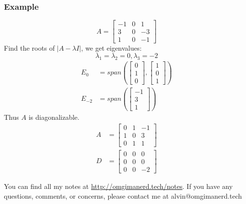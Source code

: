 \documentclass{math}
\begin{document}
\subsubsection*{Example}
\[ A = \begin{bmatrix}-1 & 0 & 1 \\ 3 & 0 & -3 \\ 1 & 0 & -1\end{bmatrix} \]
Find the roots of \( |A-\lambda I| \), we get eigenvalues:
\[ \lambda_1 = \lambda_2 = 0, \lambda_3 = -2 \]
\begin{align*}
  E_0 &= span\left(
    \begin{bmatrix}0 \\ 1 \\ 0\end{bmatrix},
    \begin{bmatrix}1 \\ 0 \\ 1\end{bmatrix}\right) \\
  E_{-2} &= span\left(\begin{bmatrix}-1 \\ 3 \\ 1\end{bmatrix}\right)
\end{align*}
Thus \( A \) is diagonalizable.
\begin{align*}
  A &= \begin{bmatrix}
    0 & 1 & -1 \\
    1 & 0 & 3 \\
    0 & 1 & 1
  \end{bmatrix} \\
  D &= \begin{bmatrix}
    0 & 0 & 0 \\
    0 & 0 & 0 \\
    0 & 0 & -2
  \end{bmatrix}
\end{align*}

\begin{center}
  You can find all my notes at \url{http://omgimanerd.tech/notes}. If you have
  any questions, comments, or concerns, please contact me at
  alvin@omgimanerd.tech
\end{center}
\end{document}
